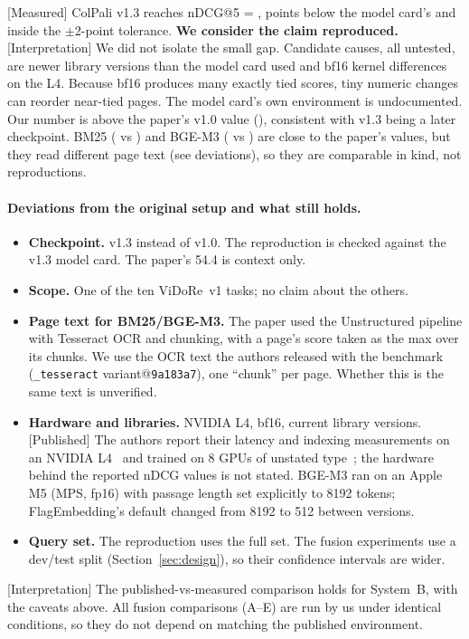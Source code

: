 \documentclass[11pt,a4paper]{article}
\newcommand{\lbl}[2]{\textsf{\scriptsize\textcolor{#1}{[#2]}}}
\newcommand{\Pub}{\lbl{tagP}{Published}}
\newcommand{\Int}{\lbl{tagI}{Interpretation}}
\newcommand{\Mea}{\lbl{tagM}{Measured}}
\begin{document}
\noindent \Mea{} ColPali v1.3 reaches nDCG@5 = \fullB{}, \gapCardPts{} points below the model card's \pubCard{} and inside the $\pm$2-point tolerance. \textbf{We consider the claim reproduced.}
\Int{} We did not isolate the small gap. Candidate causes, all untested, are newer library versions than the model card used and bf16 kernel differences on the L4. Because bf16 produces many exactly tied scores, tiny numeric changes can reorder near-tied pages. The model card's own environment is undocumented.
Our number is above the paper's v1.0 value (\pubPaper{}), consistent with v1.3 being a later checkpoint.
BM25 (\fullA{} vs \pubBMtwentyfive{}) and BGE-M3 (\fullBGE{} vs \pubBGE{}) are close to the paper's values, but they read different page text (see deviations), so they are comparable in kind, not reproductions.

\paragraph{Deviations from the original setup and what still holds.}
\begin{itemize}
  \item \textbf{Checkpoint.} v1.3 instead of v1.0. The reproduction is checked against the v1.3 model card. The paper's 54.4 is context only.
  \item \textbf{Scope.} One of the ten ViDoRe~v1 tasks; no claim about the others.
  \item \textbf{Page text for BM25/BGE-M3.} The paper used the Unstructured pipeline with Tesseract OCR and chunking, with a page's score taken as the max over its chunks. We use the OCR text the authors released with the benchmark (\texttt{\_tesseract} variant@\texttt{9a183a7}), one ``chunk'' per page. Whether this is the same text is unverified.
  \item \textbf{Hardware and libraries.} NVIDIA L4, bf16, current library versions. \Pub{} The authors report their latency and indexing measurements on an NVIDIA L4~\cite[\S3.2, \S5.2]{colpali} and trained on 8 GPUs of unstated type~\cite[\S4.2]{colpali}; the hardware behind the reported nDCG values is not stated. BGE-M3 ran on an Apple M5 (MPS, fp16) with passage length set explicitly to 8192 tokens; FlagEmbedding's default changed from 8192 to 512 between versions.
  \item \textbf{Query set.} The reproduction uses the full set. The fusion experiments use a dev/test split (Section~\ref{sec:design}), so their confidence intervals are wider.
\end{itemize}
\Int{} The published-vs-measured comparison holds for System~B, with the caveats above. All fusion comparisons (A--E) are run by us under identical conditions, so they do not depend on matching the published environment.
\end{document}

